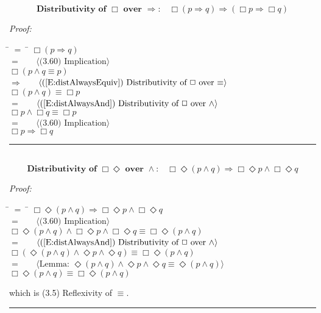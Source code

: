 \documentclass[fleqn, leqno]{article}
\newcommand{\lgap}{2pt}                             %
\newcommand{\mymathindent}{24pt}                    %
\newcommand{\Event}{\Diamond}
\newcommand{\Always}{\Box}
\newcommand{\myqed}{\hfill\rule[-.23ex]{1.2ex}{2.0ex}}
\newcommand{\Gll} {\langle}                         %
\newcommand{\Ggg} {\rangle}                         %
\newcommand{\Hint}[1]     {\ \ \ $\Gll              \mbox{#1} \Ggg$ }   %
\begin{document}
\begin{equation}\label{E:distAlwaysImp}
\textbf{Distributivity of $\Always$ over $\Rightarrow$:}\quad \Always (p \Rightarrow q) \Rightarrow (\Always p \Rightarrow \Always q)
\end{equation}

\emph{Proof:}
\begin{tabbing}
\hspace{\mymathindent} \= $= \;$ \= \kill
  \> \>   $\Always (p \Rightarrow q)$\\[\lgap]
  \> $=$  \>  \Hint{(3.60) Implication}\\[\lgap]
  \> \>   $\Always (p \land q \equiv p)$\\[\lgap]
  \> $\Rightarrow$  \>  \Hint{(\ref{E:distAlwaysEquiv}) Distributivity of $\Always$ over $\equiv$}\\[\lgap]
  \> \>   $\Always(p \land q) \equiv \Always p$\\[\lgap]
  \> $=$  \>  \Hint{(\ref{E:distAlwaysAnd}) Distributivity of $\Always$ over $\land$}\\[\lgap]
  \> \>   $\Always p \land \Always q \equiv \Always p$\\[\lgap]
  \> $=$  \>  \Hint{(3.60) Implication}\\[\lgap]
  \> \>   $\Always p \Rightarrow \Always q$\\[\lgap]
\end{tabbing}
\myqed\\[\lgap]


\begin{equation}\label{E:distAlwaysEventAnd}
\textbf{Distributivity of $\Always\Event$ over $\land$:}\quad \Always\Event(p \land q) \Rightarrow \Always\Event p \land \Always\Event q
\end{equation}

\emph{Proof:}
\begin{tabbing}
\hspace{\mymathindent} \= $= \;$ \= \kill
  \> \>   $\Always\Event(p \land q) \Rightarrow \Always\Event p \land \Always\Event q$\\[\lgap]
  \> $=$  \>  \Hint{(3.60) Implication}\\[\lgap]
  \> \>   $\Always\Event(p \land q) \land \Always\Event p \land \Always\Event q \equiv \Always\Event(p \land q)$\\[\lgap]
  \> $=$  \>  \Hint{(\ref{E:distAlwaysAnd}) Distributivity of $\Always$ over $\land$}\\[\lgap]
  \> \>   $\Always(\Event(p \land q) \land \Event p \land \Event q) \equiv \Always\Event(p \land q)$\\[\lgap]
  \> $=$  \>  \Hint{Lemma: $\Event(p \land q) \land \Event p \land \Event q \equiv \Event(p \land q)$}\\[\lgap]
  \> \>   $\Always\Event(p \land q) \equiv \Always\Event(p \land q)$\\[\lgap]
\end{tabbing}
which is (3.5) Reflexivity of $\equiv$. \myqed\\[\lgap]
\end{document}
